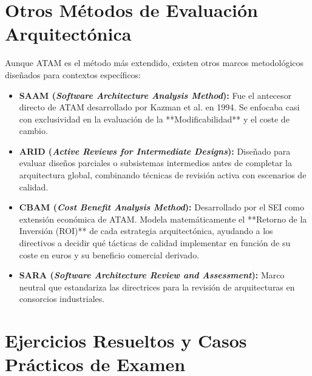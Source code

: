 \section{Otros Métodos de Evaluación Arquitectónica}
\label{sec:otros-metodos}

Aunque ATAM es el método más extendido, existen otros marcos metodológicos diseñados para contextos específicos:

\begin{itemize}[leftmargin=1.5em]
  \item \textbf{SAAM (\emph{Software Architecture Analysis Method}):} Fue el antecesor directo de ATAM desarrollado por Kazman et al. en 1994. Se enfocaba casi con exclusividad en la evaluación de la **Modificabilidad** y el coste de cambio.
  \item \textbf{ARID (\emph{Active Reviews for Intermediate Designs}):} Diseñado para evaluar diseños parciales o subsistemas intermedios antes de completar la arquitectura global, combinando técnicas de revisión activa con escenarios de calidad.
  \item \textbf{CBAM (\emph{Cost Benefit Analysis Method}):} Desarrollado por el SEI como extensión económica de ATAM. Modela matemáticamente el **Retorno de la Inversión (ROI)** de cada estrategia arquitectónica, ayudando a los directivos a decidir qué tácticas de calidad implementar en función de su coste en euros y su beneficio comercial derivado.
  \item \textbf{SARA (\emph{Software Architecture Review and Assessment}):} Marco neutral que estandariza las directrices para la revisión de arquitecturas en consorcios industriales.
\end{itemize}

\section{Ejercicios Resueltos y Casos Prácticos de Examen}
\label{sec:ejercicios-tema4}

